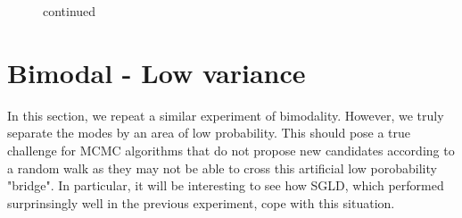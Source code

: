 \documentclass[11pt,a4paper]{report}\usepackage[]{graphicx}\usepackage[]{color}
\begin{document}
\begin{figure}[H]
\ContinuedFloat
\caption{continued}
\centering
{}
\end{figure}




\section{Bimodal - Low variance}
\label{DGP1}
In this section, we repeat a similar experiment of bimodality. However, we truly separate the modes by an area of low probability. This should pose a true challenge for MCMC algorithms that do not propose new candidates according to a random walk as they may not be able to cross this artificial low porobability "bridge". In particular, it will be interesting to see how SGLD, which performed surprinsingly well in the previous experiment, cope with this situation.
\end{document}
